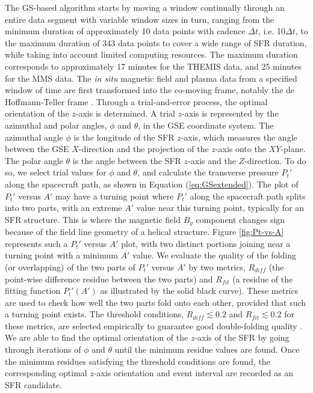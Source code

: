 The GS-based algorithm starts by moving a window continually through an entire data segment with variable window sizes in turn, ranging from the minimum duration of approximately 10 data points with cadence $\Delta t$, i.e. 10$\Delta t$, to the maximum duration of 343 data points to cover a wide range of SFR duration, while taking into account limited computing resources. The maximum duration corresponds to approximately 17 minutes for the THEMIS data, and 25 minutes for the MMS data. The \textit{in situ} magnetic field and plasma data from a specified window of time are first transformed into the co-moving frame, notably the de Hoffmann-Teller frame \citep{deHoffman-Teller:1950}. Through a trial-and-error process, the optimal orientation of the $z$-axis is determined. A trial $z$-axis is represented by the azimuthal and polar angles, $\phi$ and $\theta$, in the GSE coordinate system. The azimuthal angle $\phi$ is the longitude of the SFR $z$-axis, which measures the angle between the GSE $X$-direction and the projection of the $z$-axis onto the $XY$-plane. The polar angle $\theta$ is the angle between the SFR $z$-axis and the $Z$-direction. To do so, we select trial values for $\phi$ and $\theta$, and calculate the transverse pressure $P_t'$ along the spacecraft path, as shown in Equation (\ref{eq:GSextended}). The plot of $P_t'$ versus $A'$ may have a turning point where $P_t'$ along the spacecraft path splits into two parts, with an extreme $A'$ value near this turning point, typically for an SFR structure. This is where the magnetic field $B_y$ component changes sign because of the field line geometry of a helical structure. Figure \ref{fig:Pt-vs-A} represents such a $P_t'$ versus $A'$ plot, with two distinct portions joining near a turning point with a minimum $A'$ value. We evaluate the quality of the folding (or overlapping) of the two parts of $P_t'$ versus $A'$ by two metrics, $R_{diff}$ (the point-wise difference residue between the two parts) and $R_{fit}$ (a residue of the fitting function $P_t'(A')$ as illustrated by the solid black curve). These metrics are used to check how well the two parts fold onto each other, provided that such a turning point exists. The threshold conditions, $R_{diff}\lesssim 0.2$ and $R_{fit}\lesssim 0.2$ for these metrics, are selected empirically to guarantee good double-folding quality \citep{Hu:2018}. We are able to find the optimal orientation of the $z$-axis of the SFR by going through iterations of $\phi$ and $\theta$ until the minimum residue values are found. Once the minimum residues satisfying the threshold conditions are found, the corresponding optimal $z$-axis orientation and event interval are recorded as an SFR candidate.

